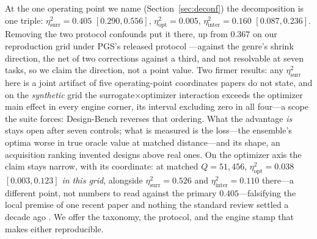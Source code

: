 \documentclass[letterpaper]{article} %
\theoremstyle{plain}
\newcommand{\mdemph}[1]{\emph{#1}}
\begin{document}
At the one operating point we name (Section~\ref{sec:deconf}) the decomposition is one triple: $\eta^2_{\text{surr}}{=}0.405$ $[0.290,0.556]$, $\eta^2_{\text{opt}}{=}0.005$, $\eta^2_{\text{inter}}{=}0.160$ $[0.087,0.236]$. Removing the two protocol confounds put it there, up from $0.367$ on our reproduction grid under PGS's released protocol \citep{chemingui2024pggs}---against the genre's shrink direction, the net of two corrections against a third, and not resolvable at seven tasks, so we claim the direction, not a point value. Two firmer results: any $\eta^2_{\text{surr}}$ here is a joint artifact of five operating-point coordinates papers do not state, and on the \mdemph{synthetic} grid the surrogate$\times$optimizer interaction exceeds the optimizer main effect in every engine corner, its interval excluding zero in all four---a scope the suite forces: Design-Bench reverses that ordering. What the advantage \mdemph{is} stays open after seven controls; what is measured is the loss---the ensemble's optima worse in true oracle value at matched distance---and its shape, an acquisition ranking invented designs above real ones. On the optimizer axis the claim stays narrow, with its coordinate: at matched $Q{=}51{,}456$, $\eta^2_{\text{opt}}{=}0.038$ $[0.003,0.123]$ \mdemph{in this grid}, alongside $\eta^2_{\text{surr}}{=}0.526$ and $\eta^2_{\text{inter}}{=}0.110$ there---a different point, not numbers to read against the primary $0.405$---falsifying the local premise of one recent paper \citep{chemingui2024pggs} and nothing the standard review settled a decade ago \citep{shahriari2016humanoutoftheloop}. We offer the taxonomy, the protocol, and the engine stamp that makes either reproducible.


\end{document}
